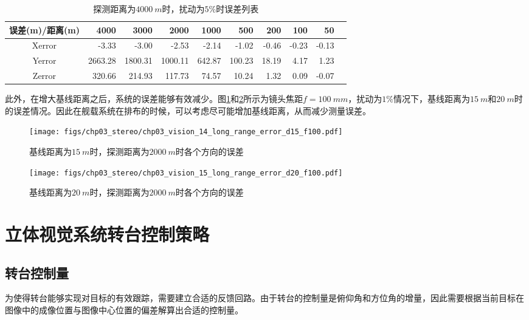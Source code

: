 \begin{table}[htb]
	\centering
	\caption{探测距离为$4000\ m$时，扰动为$5\%$时误差列表}
	\label{label:chp03_stereo_2}
	\begin{tabular}{crrrrrrrrr}
		\hline
		误差(m)/距离(m)     & 4000    & 3000    & 2000      & 1000  & 500    & 200   & 100   & 50    \\ \hline
		Xerror  & -3.33   & -3.00   & -2.53   & -2.14   & -1.02  & -0.46 & -0.23 & -0.13 \\ 
		Yerror & 2663.28 & 1800.31 & 1000.11 & 642.87  & 100.23 & 18.19 & 4.17  & 1.23  \\
		Zerror & 320.66  & 214.93  & 117.73  & 74.57   & 10.24  & 1.32  & 0.09  & -0.07 \\ \hline
		
	\end{tabular}
\end{table}

此外，在增大基线距离之后，系统的误差能够有效减少。图\ref{fig:chp03_vision_14_long_range_error_d15_f100}和\ref{fig:chp03_vision_15_long_range_error_d20_f100}所示为镜头焦距$f=100\ mm$，扰动为$1\%$情况下，基线距离为$15\ m$和$20\ m$时的误差情况。因此在舰载系统在排布的时候，可以考虑尽可能增加基线距离，从而减少测量误差。

\begin{figure}[htb]
	\centering
	\texttt{[image: figs/chp03\_stereo/chp03\_vision\_14\_long\_range\_error\_d15\_f100.pdf]}	
	\caption{基线距离为$15\ m$时，探测距离为$2000\ m$时各个方向的误差}
	\label{fig:chp03_vision_14_long_range_error_d15_f100}
\end{figure}

\begin{figure}[htb]
	\centering
	\texttt{[image: figs/chp03\_stereo/chp03\_vision\_15\_long\_range\_error\_d20\_f100.pdf]}	
	\caption{基线距离为$20\ m$时，探测距离为$2000\ m$时各个方向的误差}
	\label{fig:chp03_vision_15_long_range_error_d20_f100}
\end{figure}



\section{立体视觉系统转台控制策略}
\subsection{转台控制量}
为使得转台能够实现对目标的有效跟踪，需要建立合适的反馈回路。由于转台的控制量是俯仰角和方位角的增量，因此需要根据当前目标在图像中的成像位置与图像中心位置的偏差解算出合适的控制量。

